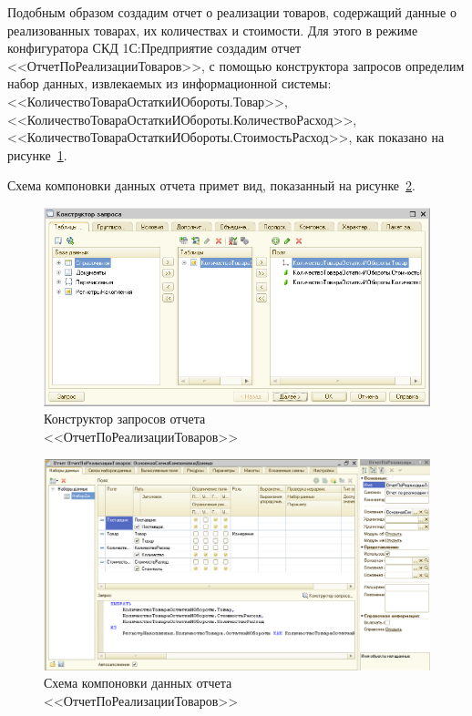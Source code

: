 Подобным образом создадим отчет о реализации товаров,
содержащий данные о реализованных товарах, их количествах и стоимости.
Для этого в режиме конфигуратора СКД 1С:Предприятие создадим отчет
<<ОтчетПоРеализацииТоваров>>, с помощью конструктора запросов
определим набор данных, извлекаемых из информационной системы:
<<КоличествоТовараОстаткиИОбороты.Товар>>,
<<КоличествоТовараОстаткиИОбороты.КоличествоРасход>>,
<<КоличествоТовараОстаткиИОбороты.СтоимостьРасход>>,
как показано на рисунке~\ref{fig:report_output_query}.

Схема компоновки данных отчета примет вид,
показанный на рисунке~\ref{fig:report_output_scheme}.

\begin{figure}[h!]
  \centering
  \includegraphics[width=150mm]{pic/report_output_query}
  \caption{Конструктор запросов отчета \\ <<ОтчетПоРеализацииТоваров>>}
  \label{fig:report_output_query}
\end{figure}

\begin{figure}[h!]
  \centering
  \includegraphics[width=150mm]{pic/report_output_scheme}
  \caption{Схема компоновки данных отчета \\ <<ОтчетПоРеализацииТоваров>>}
  \label{fig:report_output_scheme}
\end{figure}

